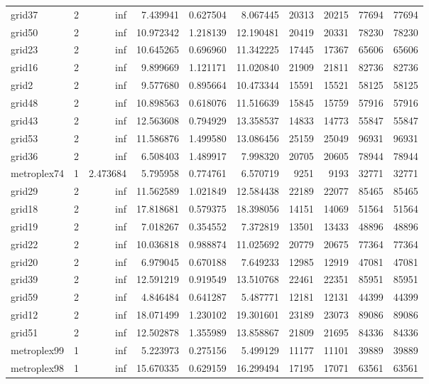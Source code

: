 \begin{longtable}{|l|r|r|r|r|r|r|r|r|r|}
grid37 & 2 & inf & 7.439941 & 0.627504 & 8.067445 & 20313 & 20215 & 77694 & 77694 \\
grid50 & 2 & inf & 10.972342 & 1.218139 & 12.190481 & 20419 & 20331 & 78230 & 78230 \\
grid23 & 2 & inf & 10.645265 & 0.696960 & 11.342225 & 17445 & 17367 & 65606 & 65606 \\
grid16 & 2 & inf & 9.899669 & 1.121171 & 11.020840 & 21909 & 21811 & 82736 & 82736 \\
grid2 & 2 & inf & 9.577680 & 0.895664 & 10.473344 & 15591 & 15521 & 58125 & 58125 \\
grid48 & 2 & inf & 10.898563 & 0.618076 & 11.516639 & 15845 & 15759 & 57916 & 57916 \\
grid43 & 2 & inf & 12.563608 & 0.794929 & 13.358537 & 14833 & 14773 & 55847 & 55847 \\
grid53 & 2 & inf & 11.586876 & 1.499580 & 13.086456 & 25159 & 25049 & 96931 & 96931 \\
grid36 & 2 & inf & 6.508403 & 1.489917 & 7.998320 & 20705 & 20605 & 78944 & 78944 \\
metroplex74 & 1 & 2.473684 & 5.795958 & 0.774761 & 6.570719 & 9251 & 9193 & 32771 & 32771 \\
grid29 & 2 & inf & 11.562589 & 1.021849 & 12.584438 & 22189 & 22077 & 85465 & 85465 \\
grid18 & 2 & inf & 17.818681 & 0.579375 & 18.398056 & 14151 & 14069 & 51564 & 51564 \\
grid19 & 2 & inf & 7.018267 & 0.354552 & 7.372819 & 13501 & 13433 & 48896 & 48896 \\
grid22 & 2 & inf & 10.036818 & 0.988874 & 11.025692 & 20779 & 20675 & 77364 & 77364 \\
grid20 & 2 & inf & 6.979045 & 0.670188 & 7.649233 & 12985 & 12919 & 47081 & 47081 \\
grid39 & 2 & inf & 12.591219 & 0.919549 & 13.510768 & 22461 & 22351 & 85951 & 85951 \\
grid59 & 2 & inf & 4.846484 & 0.641287 & 5.487771 & 12181 & 12131 & 44399 & 44399 \\
grid12 & 2 & inf & 18.071499 & 1.230102 & 19.301601 & 23189 & 23073 & 89086 & 89086 \\
grid51 & 2 & inf & 12.502878 & 1.355989 & 13.858867 & 21809 & 21695 & 84336 & 84336 \\
metroplex99 & 1 & inf & 5.223973 & 0.275156 & 5.499129 & 11177 & 11101 & 39889 & 39889 \\
metroplex98 & 1 & inf & 15.670335 & 0.629159 & 16.299494 & 17195 & 17071 & 63561 & 63561 \\

\end{longtable}
